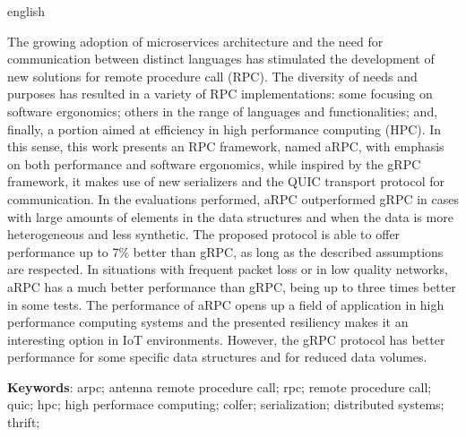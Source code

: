\begin{resumo}[Abstract]
\begin{otherlanguage*}{english}
\begin{SingleSpace}
The growing adoption of microservices architecture and the need for communication between distinct languages has stimulated the development of new solutions for remote procedure call (RPC). The diversity of needs and purposes has resulted in a variety of RPC implementations: some focusing on software ergonomics; others in the range of languages and functionalities; and, finally, a portion aimed at efficiency in high performance computing (HPC). In this sense, this work presents an RPC framework, named aRPC, with emphasis on both performance and software ergonomics, while inspired by the gRPC framework, it makes use of new serializers and the QUIC transport protocol for communication.
In the evaluations performed, aRPC outperformed gRPC in cases with large amounts of elements in the data structures and when the data is more heterogeneous and less synthetic. The proposed protocol is able to offer performance up to 7\% better than gRPC, as long as the described assumptions are respected. In situations with frequent packet loss or in low quality networks, aRPC has a much better performance than gRPC, being up to three times better in some tests. The performance of aRPC opens up a field of application in high performance computing systems and the presented resiliency makes it an interesting option in IoT environments. However, the gRPC protocol has better performance for some specific data structures and for reduced data volumes.
\end{SingleSpace}

\vspace{\onelineskip}
\textbf{Keywords}: arpc; antenna remote procedure call; rpc; remote procedure call; quic; hpc; high performace computing; colfer; serialization; distributed systems; thrift;
\end{otherlanguage*}
\end{resumo}






